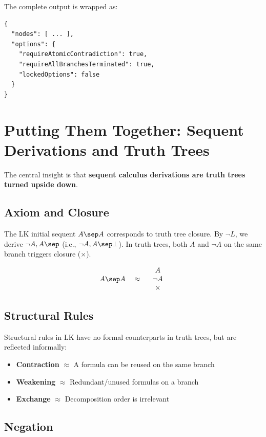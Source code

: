 \documentclass[12pt, letterpaper]{article}
\begin{document}
The complete output is wrapped as:
\begin{verbatim}
{
  "nodes": [ ... ],
  "options": {
    "requireAtomicContradiction": true,
    "requireAllBranchesTerminated": true,
    "lockedOptions": false
  }
}
\end{verbatim}

\pagebreak

\section*{Putting Them Together: Sequent Derivations and Truth Trees}

The central insight is that \textbf{sequent calculus derivations are truth trees turned upside down}.

\subsection*{Axiom and Closure}

The LK initial sequent $A \sep A$ corresponds to truth tree closure. By $\neg L$, we derive $\neg A, A \sep$ (i.e., $\neg A, A \sep \bot$). In truth trees, both $A$ and $\neg A$ on the same branch triggers closure ($\times$).

\[
A \sep A \quad \approx \quad
\begin{array}{c}
A \\ \neg A \\ \times
\end{array}
\]

\subsection*{Structural Rules}

Structural rules in LK have no formal counterparts in truth trees, but are reflected informally:

\begin{itemize}[nosep]
    \item \textbf{Contraction} $\approx$ A formula can be reused on the same branch
    \item \textbf{Weakening} $\approx$ Redundant/unused formulas on a branch
    \item \textbf{Exchange} $\approx$ Decomposition order is irrelevant
\end{itemize}

\subsection*{Negation}
\end{document}

